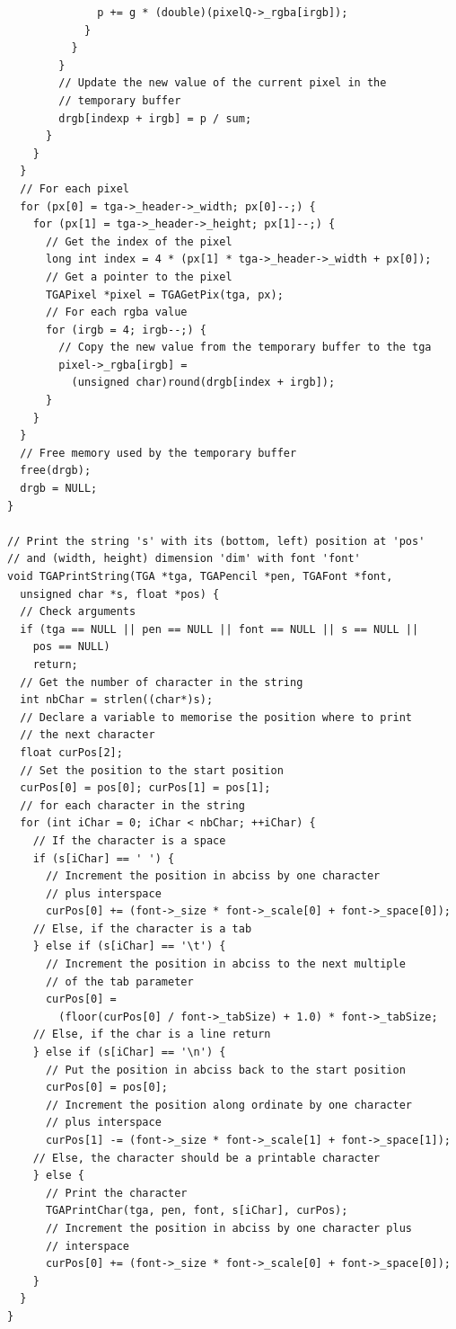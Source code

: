 \documentclass[12pt, a4paper]{article}
\begin{document}
\begin{scriptsize}
\begin{ttfamily}
\begin{lstlisting}
              p += g * (double)(pixelQ->_rgba[irgb]);
            }
          }
        }
        // Update the new value of the current pixel in the 
        // temporary buffer
        drgb[indexp + irgb] = p / sum;
      }
    }
  }
  // For each pixel
  for (px[0] = tga->_header->_width; px[0]--;) {
    for (px[1] = tga->_header->_height; px[1]--;) {
      // Get the index of the pixel
      long int index = 4 * (px[1] * tga->_header->_width + px[0]);
      // Get a pointer to the pixel
      TGAPixel *pixel = TGAGetPix(tga, px);
      // For each rgba value
      for (irgb = 4; irgb--;) {
        // Copy the new value from the temporary buffer to the tga
        pixel->_rgba[irgb] = 
          (unsigned char)round(drgb[index + irgb]);  
      }
    }
  } 
  // Free memory used by the temporary buffer
  free(drgb);
  drgb = NULL;
}

// Print the string 's' with its (bottom, left) position at 'pos'
// and (width, height) dimension 'dim' with font 'font'
void TGAPrintString(TGA *tga, TGAPencil *pen, TGAFont *font, 
  unsigned char *s, float *pos) {
  // Check arguments
  if (tga == NULL || pen == NULL || font == NULL || s == NULL ||
    pos == NULL)
    return;
  // Get the number of character in the string
  int nbChar = strlen((char*)s);
  // Declare a variable to memorise the position where to print 
  // the next character
  float curPos[2];
  // Set the position to the start position
  curPos[0] = pos[0]; curPos[1] = pos[1]; 
  // for each character in the string
  for (int iChar = 0; iChar < nbChar; ++iChar) {
    // If the character is a space
    if (s[iChar] == ' ') {
      // Increment the position in abciss by one character 
      // plus interspace
      curPos[0] += (font->_size * font->_scale[0] + font->_space[0]);
    // Else, if the character is a tab
    } else if (s[iChar] == '\t') {
      // Increment the position in abciss to the next multiple 
      // of the tab parameter
      curPos[0] = 
        (floor(curPos[0] / font->_tabSize) + 1.0) * font->_tabSize;
    // Else, if the char is a line return
    } else if (s[iChar] == '\n') {
      // Put the position in abciss back to the start position
      curPos[0] = pos[0];
      // Increment the position along ordinate by one character 
      // plus interspace
      curPos[1] -= (font->_size * font->_scale[1] + font->_space[1]);
    // Else, the character should be a printable character
    } else {
      // Print the character
      TGAPrintChar(tga, pen, font, s[iChar], curPos);
      // Increment the position in abciss by one character plus
      // interspace
      curPos[0] += (font->_size * font->_scale[0] + font->_space[0]);
    }
  }
}


\end{lstlisting}
\end{ttfamily}
\end{scriptsize}
\end{document}
